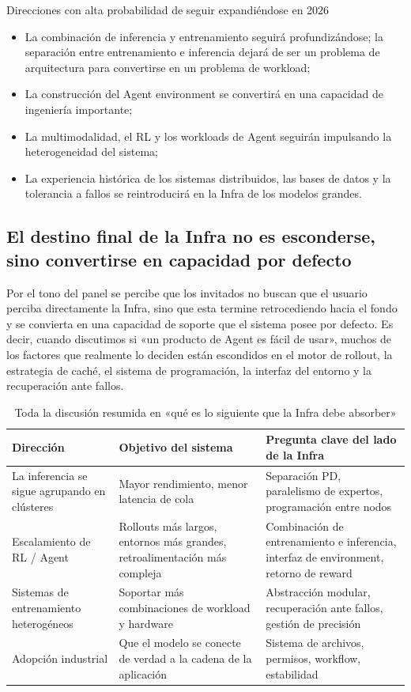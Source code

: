 \documentclass[a4paper]{article}
\begin{document}
\begin{importantbox}{Direcciones con alta probabilidad de seguir expandiéndose en 2026}
\begin{itemize}
  \item La combinación de inferencia y entrenamiento seguirá profundizándose; la separación entre entrenamiento e inferencia dejará de ser un problema de arquitectura para convertirse en un problema de workload;
  \item La construcción del Agent environment se convertirá en una capacidad de ingeniería importante;
  \item La multimodalidad, el RL y los workloads de Agent seguirán impulsando la heterogeneidad del sistema;
  \item La experiencia histórica de los sistemas distribuidos, las bases de datos y la tolerancia a fallos se reintroducirá en la Infra de los modelos grandes.
\end{itemize}
\end{importantbox}

\subsection{El destino final de la Infra no es esconderse, sino convertirse en capacidad por defecto}
Por el tono del panel se percibe que los invitados no buscan que el usuario perciba directamente la Infra, sino que esta termine retrocediendo hacia el fondo y se convierta en una capacidad de soporte que el sistema posee por defecto. Es decir, cuando discutimos si «un producto de Agent es fácil de usar», muchos de los factores que realmente lo deciden están escondidos en el motor de rollout, la estrategia de caché, el sistema de programación, la interfaz del entorno y la recuperación ante fallos.

\begin{table}[H]
\centering
\begin{tabular}{p{2.8cm}p{4.2cm}p{4.4cm}}
\toprule
\textbf{Dirección} & \textbf{Objetivo del sistema} & \textbf{Pregunta clave del lado de la Infra} \\
\midrule
La inferencia se sigue agrupando en clústeres & Mayor rendimiento, menor latencia de cola & Separación PD, paralelismo de expertos, programación entre nodos \\
Escalamiento de RL / Agent & Rollouts más largos, entornos más grandes, retroalimentación más compleja & Combinación de entrenamiento e inferencia, interfaz de environment, retorno de reward \\
Sistemas de entrenamiento heterogéneos & Soportar más combinaciones de workload y hardware & Abstracción modular, recuperación ante fallos, gestión de precisión \\
Adopción industrial & Que el modelo se conecte de verdad a la cadena de la aplicación & Sistema de archivos, permisos, workflow, estabilidad \\
\bottomrule
\end{tabular}
\caption{Toda la discusión resumida en «qué es lo siguiente que la Infra debe absorber»}
\end{table}
\end{document}
